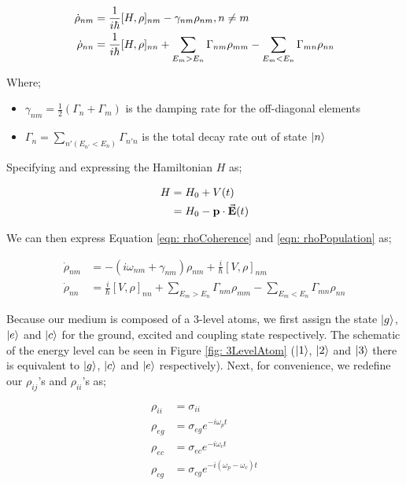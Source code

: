 \begin{align}
    \Dot{\rho}_{nm} &= \frac{1}{i\hbar} [H, \rho]_{nm} - \gamma_{nm} \rho_{nm}, \space n \neq m \label{eqn: rhoCoherence}\\
    \Dot{\rho}_{nn} &= \frac{1}{i\hbar} [H, \rho]_{nn} + \sum_{E_{m} > E_{n}} \Gamma_{nm}\rho_{mm} - \sum_{E_{m} < E_{n}} \Gamma_{mn} \rho_{nn} \label{eqn: rhoPopulation}
\end{align} 
    
Where;

\begin{itemize}
    \item $\gamma_{nm} = \frac{1}{2} (\Gamma_{n} + \Gamma_{m})$ is the damping rate for the off-diagonal elements
    \item $\Gamma_{n} = \sum_{n'(E_{n'} < E_{n})} \Gamma_{n'n}$ is the total decay rate out of state $\ket{n}$
\end{itemize}

Specifying and expressing the Hamiltonian $H$ as;

\begin{align}
    H &= H_{0} + V(t)\\
            &= H_{0} - \vb{p} \cdot \va{E}(t)
\end{align}

We can then express Equation \ref{eqn: rhoCoherence} and \ref{eqn: rhoPopulation} as;

\begin{align}
    \Dot{\rho}_{nm} &= -(i\omega_{nm} + \gamma_{nm}) \rho_{nm} + \frac{i}{\hbar} [V, \rho]_{nm} \label{eqn: rhoCohNew}\\
    \Dot{\rho}_{nn} &= \frac{i}{\hbar} [V, \rho]_{nn} + \sum_{E_{m} > E_{n}} \Gamma_{nm}\rho_{mm} - \sum_{E_{m} < E_{n}} \Gamma_{mn} \rho_{nn} \label{eqn: rhoPopNew}
\end{align}

Because our medium is composed of a 3-level atoms, we first assign the state $\ket{g}$, $\ket{e}$ and $\ket{c}$ for the ground, excited and coupling state respectively. The schematic of the energy level can be seen in Figure \ref{fig: 3LevelAtom} \cite{jeong2010slow} ($\ket{1}$, $\ket{2}$ and $\ket{3}$ there is equivalent to $\ket{g}$, $\ket{c}$ and $\ket{e}$ respectively). Next, for convenience, we redefine our $\rho_{ij}$'s and $\rho_{ii}$'s as;

\begin{align}
    \rho_{ii} &= \sigma_{ii} \label{eqn: rhoFirst}\\
    \rho_{eg} &= \sigma_{eg} e^{-i \omega_{p} t}\\
    \rho_{ec} &= \sigma_{ec} e^{-i \omega_{c} t}\\
    \rho_{cg} &= \sigma_{cg} e^{-i (\omega_{p} - \omega_{c}) t} \label{eqn: rhoLast}
\end{align}

